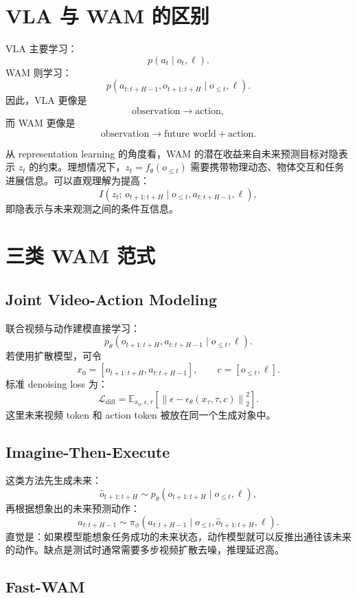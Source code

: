 \documentclass[11pt,a4paper]{ctexart}
\begin{document}
\section{VLA 与 WAM 的区别}

VLA 主要学习：
\[
  p(a_t\mid o_t,\ell).
\]
WAM 则学习：
\[
  p(a_{t:t+H-1},o_{t+1:t+H}\mid o_{\le t},\ell).
\]
因此，VLA 更像是
\[
  \text{observation}\rightarrow \text{action},
\]
而 WAM 更像是
\[
  \text{observation}\rightarrow \text{future world}+\text{action}.
\]

从 representation learning 的角度看，WAM 的潜在收益来自未来预测目标对隐表示 $z_t$ 的约束。理想情况下，$z_t=f_\theta(o_{\le t})$ 需要携带物理动态、物体交互和任务进展信息。可以直观理解为提高：
\[
  I(z_t;\,o_{t+1:t+H}\mid o_{\le t},a_{t:t+H-1},\ell),
\]
即隐表示与未来观测之间的条件互信息。

\section{三类 WAM 范式}

\subsection{Joint Video-Action Modeling}

联合视频与动作建模直接学习：
\[
  p_\theta(o_{t+1:t+H},a_{t:t+H-1}\mid o_{\le t},\ell).
\]
若使用扩散模型，可令
\[
  x_0=[o_{t+1:t+H},a_{t:t+H-1}],\qquad c=[o_{\le t},\ell].
\]
标准 denoising loss 为：
\[
  \mathcal{L}_{\mathrm{diff}}
  =
  \mathbb{E}_{x_0,\epsilon,\tau}
  \left[
    \left\|
      \epsilon-\epsilon_\theta(x_\tau,\tau,c)
    \right\|_2^2
  \right].
\]
这里未来视频 token 和 action token 被放在同一个生成对象中。

\subsection{Imagine-Then-Execute}

这类方法先生成未来：
\[
  \hat{o}_{t+1:t+H}\sim
  p_\theta(o_{t+1:t+H}\mid o_{\le t},\ell),
\]
再根据想象出的未来预测动作：
\[
  a_{t:t+H-1}\sim
  \pi_\phi(a_{t:t+H-1}\mid o_{\le t},\hat{o}_{t+1:t+H},\ell).
\]
直觉是：如果模型能想象任务成功的未来状态，动作模型就可以反推出通往该未来的动作。缺点是测试时通常需要多步视频扩散去噪，推理延迟高。

\subsection{Fast-WAM}
\end{document}
